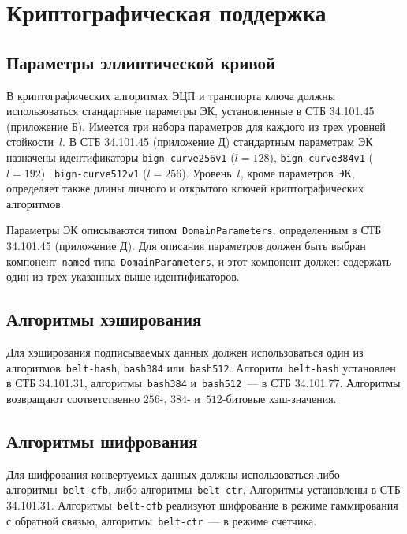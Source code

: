 \chapter{Криптографическая поддержка}\label{CRYPTO}

\section{Параметры эллиптической кривой}\label{CRYPTO.Params}

В криптографических алгоритмах ЭЦП и транспорта ключа должны
использоваться стандартные параметры ЭК, 
установленные в СТБ 34.101.45 (приложение Б). 
%
Имеется три набора параметров для каждого из трех уровней стойкости~$l$.
%
В СТБ 34.101.45 (приложение Д) стандартным параметрам ЭК назначены 
идентификаторы 
\texttt{bign-curve256v1} ($l=128$), 
\texttt{bign-curve384v1} ($l=192$)
~\texttt{bign-curve512v1} ($l=256$).
%
Уровень~$l$, кроме параметров ЭК, определяет также длины личного и 
открытого ключей криптографических алгоритмов.

Параметры ЭК описываются типом~\texttt{DomainParameters},
определенным в СТБ 34.101.45 (приложение Д). Для описания параметров
должен быть выбран компонент~\texttt{named} типа~\texttt{DomainParameters},
и этот компонент должен содержать один из трех указанных выше
идентификаторов.

\section{Алгоритмы хэширования}\label{CRYPTO.Hash}

Для хэширования подписываемых данных должен использоваться один из
алгоритмов~\texttt{belt-hash}, \texttt{bash384} или~\texttt{bash512}.
%
Алгоритм~\texttt{belt-hash} установлен в СТБ 34.101.31,
алгоритмы~\texttt{bash384} и~\texttt{bash512}~--- в СТБ 34.101.77.
%
Алгоритмы возвращают соответственно $256$-, $384$- 
и~$512$-битовые хэш-значения.

\section{Алгоритмы шифрования}\label{CRYPTO.Encr}

Для шифрования конвертуемых данных должны использоваться либо
алгоритмы~\texttt{belt-cfb}, либо алгоритмы~\texttt{belt-ctr}.
%
Алгоритмы установлены в СТБ 34.101.31.
%
Алгоритмы~\texttt{belt-cfb} реализуют шифрование в режиме гаммирования с 
обратной связью, алгоритмы~\texttt{belt-ctr}~--- в режиме счетчика.

